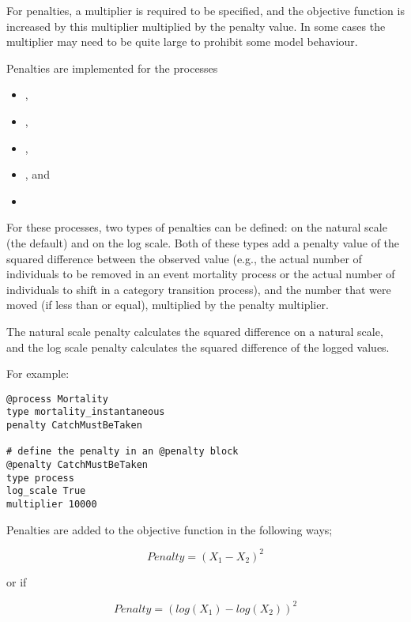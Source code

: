 For penalties, a multiplier is required to be specified, and the objective function is increased by this multiplier multiplied by the penalty value. In some cases the multiplier may need to be quite large to prohibit some model behaviour.

Penalties are implemented for the processes

\begin{itemize}
	\item {},
	\item {},
	\item {},
	\item {}, and
	\item {}
\end{itemize}

For these processes, two types of penalties can be defined: on the natural scale (the default) and on the log scale. Both of these types add a penalty value of the squared difference between the observed value (e.g., the actual number of individuals to be removed in an event mortality process or the actual number of individuals to shift in a category transition process), and the number that were moved (if less than or equal), multiplied by the penalty multiplier.

The natural scale penalty calculates the squared difference on a natural scale, and the log scale penalty calculates the squared difference of the logged values.

For example:

{\small{\begin{verbatim}
@process Mortality
type mortality_instantaneous
penalty CatchMustBeTaken

# define the penalty in an @penalty block
@penalty CatchMustBeTaken
type process
log_scale True
multiplier 10000
\end{verbatim}}}

Penalties are added to the objective function in the following ways;

\begin{equation}
	Penalty = (X_1 - X_2)^2
\end{equation}

or if 

\begin{equation}
Penalty = (log(X_1) - log(X_2))^2
\end{equation}

